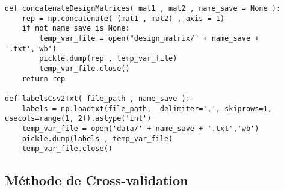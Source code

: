 \documentclass{article}
\begin{document}
\begin{lstlisting}
def concatenateDesignMatrices( mat1 , mat2 , name_save = None ):
    rep = np.concatenate( (mat1 , mat2) , axis = 1)
    if not name_save is None:
        temp_var_file = open("design_matrix/" + name_save + '.txt','wb')
        pickle.dump(rep , temp_var_file)
        temp_var_file.close()
    return rep

def labelsCsv2Txt( file_path , name_save ):
    labels = np.loadtxt(file_path,  delimiter=',', skiprows=1, usecols=range(1, 2)).astype('int')
    temp_var_file = open('data/' + name_save + '.txt','wb')
    pickle.dump(labels , temp_var_file)
    temp_var_file.close()

\end{lstlisting}

\subsection{Méthode de Cross-validation}
\end{document}
